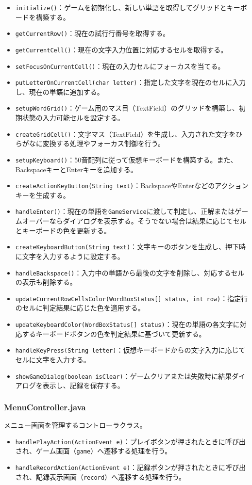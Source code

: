 \documentclass[a4j]{ujarticle}
\begin{document}
\begin{itemize}
  \item \texttt{initialize()}：ゲームを初期化し、新しい単語を取得してグリッドとキーボードを構築する。
  \item \texttt{getCurrentRow()}：現在の試行行番号を取得する。
  \item \texttt{getCurrentCell()}：現在の文字入力位置に対応するセルを取得する。
  \item \texttt{setFocusOnCurrentCell()}：現在の入力セルにフォーカスを当てる。
  \item \texttt{putLetterOnCurrentCell(char letter)}：指定した文字を現在のセルに入力し、現在の単語に追加する。
  \item \texttt{setupWordGrid()}：ゲーム用のマス目（TextField）のグリッドを構築し、初期状態の入力可能セルを設定する。
  \item \texttt{createGridCell()}：文字マス（TextField）を生成し、入力された文字をひらがなに変換する処理やフォーカス制御を行う。
  \item \texttt{setupKeyboard()}：50音配列に従って仮想キーボードを構築する。また、BackspaceキーとEnterキーを追加する。
  \item \texttt{createActionKeyButton(String text)}：BackspaceやEnterなどのアクションキーを生成する。
  \item \texttt{handleEnter()}：現在の単語を\texttt{GameService}に渡して判定し、正解またはゲームオーバーならダイアログを表示する。そうでない場合は結果に応じてセルとキーボードの色を更新する。
  \item \texttt{createKeyboardButton(String text)}：文字キーのボタンを生成し、押下時に文字を入力するように設定する。
  \item \texttt{handleBackspace()}：入力中の単語から最後の文字を削除し、対応するセルの表示も削除する。
  \item \texttt{updateCurrentRowCellsColor(WordBoxStatus[] status, int row)}：指定行のセルに判定結果に応じた色を適用する。
  \item \texttt{updateKeyboardColor(WordBoxStatus[] status)}：現在の単語の各文字に対応するキーボードボタンの色を判定結果に基づいて更新する。
  \item \texttt{handleKeyPress(String letter)}：仮想キーボードからの文字入力に応じてセルに文字を入力する。
  \item \texttt{showGameDialog(boolean isClear)}：ゲームクリアまたは失敗時に結果ダイアログを表示し、記録を保存する。
\end{itemize}

\subsubsection{MenuController.java}
メニュー画面を管理するコントローラクラス。
\begin{itemize}
\item \texttt{handlePlayAction(ActionEvent e)}：プレイボタンが押されたときに呼び出され、ゲーム画面（\texttt{game}）へ遷移する処理を行う。
\item \texttt{handleRecordAction(ActionEvent e)}：記録ボタンが押されたときに呼び出され、記録表示画面（\texttt{record}）へ遷移する処理を行う。
\end{itemize}
\end{document}
